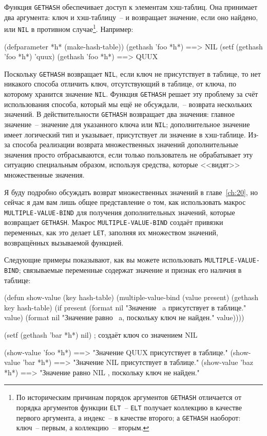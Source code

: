 Функция \lstinline{GETHASH} обеспечивает доступ к элементам хэш-таблиц.  Она принимает два
аргумента: ключ и хэш-таблицу~-- и возвращает значение, если оно найдено, или \lstinline{NIL} в
противном случае\footnote{По историческим причинам порядок аргументов \lstinline{GETHASH}
  отличается от порядка аргументов функции \lstinline{ELT}~-- \lstinline{ELT} получает коллекцию в
  качестве первого аргумента, а индекс~-- в качестве второго; а \lstinline{GETHASH} наоборот:
  ключ~-- первым, а коллекцию~-- вторым.}.  Например:

\begin{myverb}
  (defparameter *h* (make-hash-table))
  (gethash 'foo *h*) ==> NIL
  (setf (gethash 'foo *h*) 'quux)
  (gethash 'foo *h*) ==> QUUX
\end{myverb}

Поскольку \lstinline{GETHASH} возвращает \lstinline{NIL}, если ключ не присутствует в таблице, то нет
никакого способа отличить ключ, отсутствующий в таблице, от ключа, по которому хранится
значение \lstinline{NIL}.  Функция \lstinline{GETHASH} решает эту проблему за счёт использования
способа, который мы ещё не обсуждали,~-- возврата нескольких значений.  В действительности
\lstinline{GETHASH} возвращает два значения: главное значение~-- значение для указанного ключа
или \lstinline{NIL};  дополнительное значение имеет логический тип и указывает, присутствует ли
значение в хэш-таблице.  Из-за способа реализации возврата множественных значений
дополнительные значения просто отбрасываются, если только пользователь не обрабатывает эту
ситуацию специальным образом, используя средства, которые <<видят>> множественные значения.

Я буду подробно обсуждать возврат множественных значений в главе~\ref{ch:20}, но сейчас я
дам вам лишь общее представление о том, как использовать макрос \lstinline{MULTIPLE-VALUE-BIND}
для получения дополнительных значений, которые возвращает \lstinline{GETHASH}.  Макрос
\lstinline{MULTIPLE-VALUE-BIND} создаёт привязки переменных, как это делает \lstinline{LET},
заполняя их множеством значений, возвращённых вызываемой функцией.

Следующие примеры показывают, как вы можете использовать \lstinline{MULTIPLE-VALUE-BIND};
связываемые переменные содержат значение и признак его наличия в таблице:

\begin{myverb}  
  (defun show-value (key hash-table)
    (multiple-value-bind (value present) (gethash key hash-table)
      (if present
        (format nil "Значение ~a присутствует в таблице." value)
        (format nil "Значение равно ~a, поскольку ключ не найден." value))))

  (setf (gethash 'bar *h*) nil) ; создаёт ключ со значением NIL

  (show-value 'foo *h*) ==> "Значение QUUX присутствует в таблице."
  (show-value 'bar *h*) ==> "Значение NIL присутствует в таблице."
  (show-value 'baz *h*) ==> "Значение равно NIL , поскольку ключ не найден."
\end{myverb}

